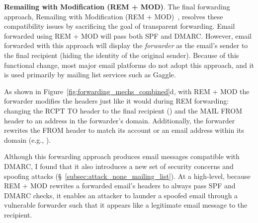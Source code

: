 
\textbf{Remailing with Modification (REM + MOD)}.
The final forwarding approach, Remailing with Modification (REM + MOD)~\cite{rfc6783},
resolves these compatibility issues by sacrificing the goal of transparent forwarding.
Email forwarded using REM + MOD will pass both SPF and DMARC.
However, email forwarded with this approach will display the \textit{forwarder} as the email's sender to the final recipient (hiding the identity of the original sender).
Because of this functional change, most major email platforms do not adopt this approach, and it is used primarily by mailing list services such as Gaggle.

As shown in Figure~\ref{fig:forwarding_mechs_combined}d, with REM + MOD the forwarder modifies the headers just like it would during REM forwarding: changing the \textsc{RCPT TO} header to the final recipient () and the \textsc{MAIL FROM} header to an address in the forwarder's domain.
Additionally, the forwarder rewrites the \textsc{FROM} header to match its account or an email address within its domain (e.g., ).

Although this forwarding approach produces email messages compatible with DMARC,
I found that it also introduces a new set of security concerns and spoofing attacks (\S~\ref{subsec:attack_none_mailing_list}).
At a high-level, because REM + MOD rewrites a forwarded email's headers to always pass SPF and DMARC checks, it enables an attacker to launder a spoofed email through a vulnerable forwarder such that it appears like a legitimate email message to the recipient.

%
%
%
%

